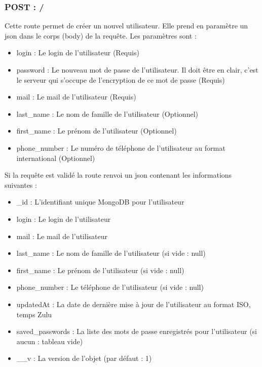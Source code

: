 \documentclass[12pt]{report}
\begin{document}
	\subsubsection{POST : /}
	Cette route permet de créer un nouvel utilisateur. Elle prend en paramètre un \gls{json} dans le corps (body) de la requête. Les paramètres sont : 
	\begin{itemize}
		\item login : Le login de l'utilisateur (Requis)
		\item password : Le nouveau mot de passe de l'utilisateur. Il doit être en clair, c'est le serveur qui s'occupe de l'encryption de ce mot de passe (Requis)
		\item mail : Le mail de l'utilisateur (Requis)
		\item last\_name : Le nom de famille de l'utilisateur (Optionnel)
		\item first\_name : Le prénom de l'utilisateur (Optionnel)
		\item phone\_number : Le numéro de téléphone de l'utilisateur au format international (Optionnel)
	\end{itemize}
	Si la requête est validé la route renvoi un \gls{json} contenant les informations suivantes :
	\begin{itemize}
		\item \_id : L'identifiant unique MongoDB pour l'utilisateur
		\item login : Le login de l'utilisateur
		\item mail : Le mail de l'utilisateur
		\item last\_name : Le nom de famille de l'utilisateur (si vide : null)
		\item first\_name : Le prénom de l'utilisateur (si vide : null)
		\item phone\_number : Le téléphone de l'utilisateur (si vide : null)
		\item updatedAt : La date de dernière mise à jour de l'utilisateur au format ISO, temps Zulu
		\item saved\_passwords : La liste des mots de passe enregistrés pour l'utilisateur (si aucun : tableau vide)
		\item \_\_v : La version de l'objet (par défaut : 1)
	\end{itemize}
\end{document}
